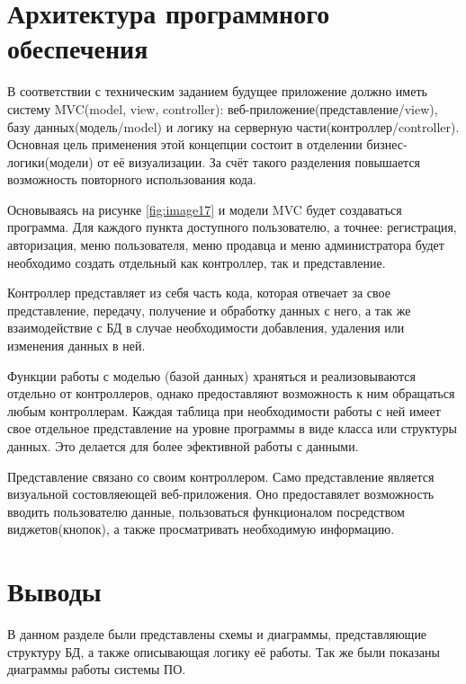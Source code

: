 \newpage

\section{Архитектура программного обеспечения}

\hspace{0.6cm} В соответствии с техническим заданием будущее приложение должно иметь систему MVC(model, view, controller): веб-приложение(представление/view), базу данных(модель/model) и логику на серверную части(контроллер/controller). Основная цель применения этой концепции состоит в отделении бизнес-логики(модели) от её визуализации. За счёт такого разделения повышается возможность повторного использования кода.

\hspace{0.6cm} Основываясь на рисунке \ref{fig:image17} и модели MVC будет создаваться программа. Для каждого пункта доступного пользователю, а точнее: регистрация, авторизация, меню пользователя, меню продавца и меню администратора будет необходимо создать отдельный как контроллер, так и представление.

\hspace{0.6cm} Контроллер представляет из себя часть кода, которая отвечает за свое представление, передачу, получение и обработку данных с него, а так же взаимодействие с БД в случае необходимости добавления, удаления или изменения данных в ней.

\hspace{0.6cm} Функции работы с моделью (базой данных) храняться и реализовываются отдельно от контроллеров, однако предоставляют возможность к ним обращаться любым контроллерам. Каждая таблица при необходимости работы с ней имеет свое отдельное представление на уровне программы в виде класса или структуры данных. Это делается для более эфективной работы с данными.

\hspace{0.6cm} Представление связано со своим контроллером. Само представление является визуальной состовляеющей веб-приложения. Оно предоставялет возможность вводить пользователю данные, пользоваться функционалом посредством виджетов(кнопок), а также просматривать необходимую информацию.

\section{Выводы}

\hspace{0.6cm} В данном разделе были представлены схемы и диаграммы, представляющие структуру БД, а также описывающая логику её работы. Так же были показаны диаграммы работы системы ПО.

